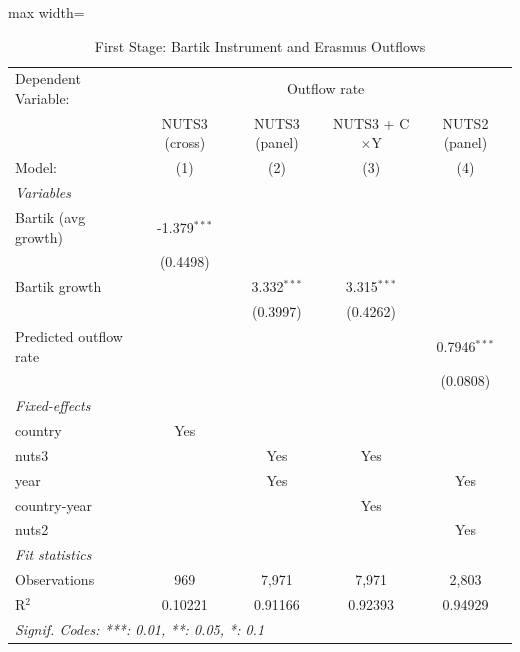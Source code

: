 \begin{table}[htbp]
   \caption{\label{tab:first_stage} First Stage: Bartik Instrument and Erasmus Outflows}
   \centering
   \scriptsize
   \begin{adjustbox}{max width=\textwidth}
   \begin{tabular}{lcccc}
      \tabularnewline \midrule \midrule
      Dependent Variable: & \multicolumn{4}{c}{Outflow rate}\\
                             & NUTS3 (cross)  & NUTS3 (panel) & NUTS3 + C$\times$Y  & NUTS2 (panel) \\   
      Model:                 & (1)            & (2)           & (3)                 & (4)\\  
      \midrule
      \emph{Variables}\\
      Bartik (avg growth)    & -1.379$^{***}$ &               &                     &   \\   
                             & (0.4498)       &               &                     &   \\   
      Bartik growth          &                & 3.332$^{***}$ & 3.315$^{***}$       &   \\   
                             &                & (0.3997)      & (0.4262)            &   \\   
      Predicted outflow rate &                &               &                     & 0.7946$^{***}$\\   
                             &                &               &                     & (0.0808)\\   
      \midrule
      \emph{Fixed-effects}\\
      country                & Yes            &               &                     & \\  
      nuts3                  &                & Yes           & Yes                 & \\  
      year                   &                & Yes           &                     & Yes\\  
      country-year           &                &               & Yes                 & \\  
      nuts2                  &                &               &                     & Yes\\  
      \midrule
      \emph{Fit statistics}\\
      Observations           & 969            & 7,971         & 7,971               & 2,803\\  
      R$^2$                  & 0.10221        & 0.91166       & 0.92393             & 0.94929\\  
      \midrule \midrule
      \multicolumn{5}{l}{\emph{Signif. Codes: ***: 0.01, **: 0.05, *: 0.1}}\\
   \end{tabular}
   \end{adjustbox}
\end{table}
